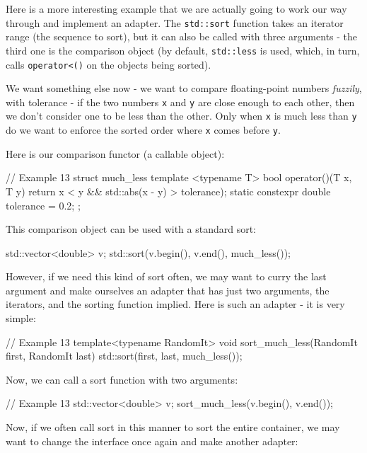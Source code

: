 Here is a more interesting example that we are actually going to work our way through and implement an adapter. The \texttt{std::sort} function takes an iterator range (the sequence to sort), but it can also be called with three arguments - the third one is the comparison object (by default, \texttt{std::less} is used, which, in turn, calls \texttt{operator\textless{}()} on the objects being sorted).

We want something else now - we want to compare floating-point numbers \emph{fuzzily}, with tolerance - if the two numbers \texttt{x} and \texttt{y} are close enough to each other, then we don't consider one to be less than the other. Only when \texttt{x} is much less than \texttt{y} do we want to enforce the sorted order where \texttt{x} comes before \texttt{y}.

Here is our comparison functor (a callable object):

\begin{code}
// Example 13
struct much_less {
  template <typename T>
  bool operator()(T x, T y) {
    return x < y && std::abs(x - y) > tolerance);
  }
  static constexpr double tolerance = 0.2;
};
\end{code}

This comparison object can be used with a standard sort:

\begin{code}
std::vector<double> v;
std::sort(v.begin(), v.end(), much_less());
\end{code}

However, if we need this kind of sort often, we may want to curry the last argument and make ourselves an adapter that has just two arguments, the iterators, and the sorting function implied. Here is such an adapter - it is very simple:

\begin{code}
// Example 13
template<typename RandomIt>
  void sort_much_less(RandomIt first, RandomIt last) {
  std::sort(first, last, much_less());
}
\end{code}

Now, we can call a sort function with two arguments:

\begin{code}
// Example 13
std::vector<double> v;
sort_much_less(v.begin(), v.end());
\end{code}

Now, if we often call sort in this manner to sort the entire container, we may want to change the interface once again and make another adapter:

